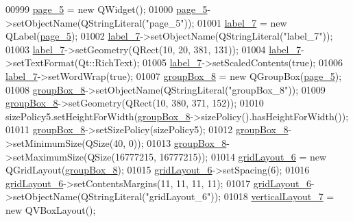 \begin{DoxyCode}
00999         \hyperlink{a00027_a421261d29369be60b551aabe8b097597}{page\_5} = \textcolor{keyword}{new} QWidget();
01000         \hyperlink{a00027_a421261d29369be60b551aabe8b097597}{page\_5}->setObjectName(QStringLiteral(\textcolor{stringliteral}{"page\_5"}));
01001         \hyperlink{a00027_a13936e6f18b1c90402b3c7a3c92b6cdb}{label\_7} = \textcolor{keyword}{new} QLabel(\hyperlink{a00027_a421261d29369be60b551aabe8b097597}{page\_5});
01002         \hyperlink{a00027_a13936e6f18b1c90402b3c7a3c92b6cdb}{label\_7}->setObjectName(QStringLiteral(\textcolor{stringliteral}{"label\_7"}));
01003         \hyperlink{a00027_a13936e6f18b1c90402b3c7a3c92b6cdb}{label\_7}->setGeometry(QRect(10, 20, 381, 131));
01004         \hyperlink{a00027_a13936e6f18b1c90402b3c7a3c92b6cdb}{label\_7}->setTextFormat(Qt::RichText);
01005         \hyperlink{a00027_a13936e6f18b1c90402b3c7a3c92b6cdb}{label\_7}->setScaledContents(\textcolor{keyword}{true});
01006         \hyperlink{a00027_a13936e6f18b1c90402b3c7a3c92b6cdb}{label\_7}->setWordWrap(\textcolor{keyword}{true});
01007         \hyperlink{a00027_a1a1fe5ec77ba52ba39a16db29ff0f91a}{groupBox\_8} = \textcolor{keyword}{new} QGroupBox(\hyperlink{a00027_a421261d29369be60b551aabe8b097597}{page\_5});
01008         \hyperlink{a00027_a1a1fe5ec77ba52ba39a16db29ff0f91a}{groupBox\_8}->setObjectName(QStringLiteral(\textcolor{stringliteral}{"groupBox\_8"}));
01009         \hyperlink{a00027_a1a1fe5ec77ba52ba39a16db29ff0f91a}{groupBox\_8}->setGeometry(QRect(10, 380, 371, 152));
01010         sizePolicy5.setHeightForWidth(\hyperlink{a00027_a1a1fe5ec77ba52ba39a16db29ff0f91a}{groupBox\_8}->sizePolicy().hasHeightForWidth());
01011         \hyperlink{a00027_a1a1fe5ec77ba52ba39a16db29ff0f91a}{groupBox\_8}->setSizePolicy(sizePolicy5);
01012         \hyperlink{a00027_a1a1fe5ec77ba52ba39a16db29ff0f91a}{groupBox\_8}->setMinimumSize(QSize(40, 0));
01013         \hyperlink{a00027_a1a1fe5ec77ba52ba39a16db29ff0f91a}{groupBox\_8}->setMaximumSize(QSize(16777215, 16777215));
01014         \hyperlink{a00027_ad113cf7b76aaf178473555bdf64ff035}{gridLayout\_6} = \textcolor{keyword}{new} QGridLayout(\hyperlink{a00027_a1a1fe5ec77ba52ba39a16db29ff0f91a}{groupBox\_8});
01015         \hyperlink{a00027_ad113cf7b76aaf178473555bdf64ff035}{gridLayout\_6}->setSpacing(6);
01016         \hyperlink{a00027_ad113cf7b76aaf178473555bdf64ff035}{gridLayout\_6}->setContentsMargins(11, 11, 11, 11);
01017         \hyperlink{a00027_ad113cf7b76aaf178473555bdf64ff035}{gridLayout\_6}->setObjectName(QStringLiteral(\textcolor{stringliteral}{"gridLayout\_6"}));
01018         \hyperlink{a00027_a7b66d5d6ab55f3977317359d09a42345}{verticalLayout\_7} = \textcolor{keyword}{new} QVBoxLayout();

\end{DoxyCode}

